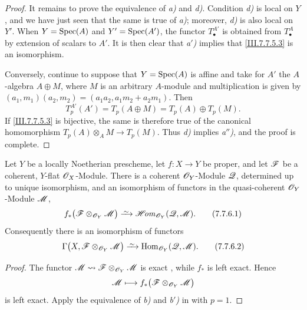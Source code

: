 {\begin{proof}
It remains to prove the equivalence of \emph{a)} and \emph{d)}.  Condition
\emph{d)} is local on $Y$, and we have just seen that the same is
true of \emph{a)}; moreover, \emph{d)} is also local on $Y'$.  When
$Y=\operatorname{Spec}(A)$ and $Y'=\operatorname{Spec}(A')$, the functor
$T^{A'}_\bullet$ is obtained from $T^A_\bullet$ by extension
of scalars to $A'$.  It is then clear that \emph{a$'$)} implies
that \eqref{III.7.7.5.3} is an isomorphism.

Conversely, continue to suppose that $Y=\operatorname{Spec}(A)$ is affine
and take for $A'$ the $A$-algebra $A\oplus M$, where $M$ is
an arbitrary $A$-module and multiplication is given by $(a_1,m_1)(a_2,m_2)=(a_1a_2,a_1m_2+a_2m_1)$.
Then
\[
  T^{A'}_p(A')
  =
  T_p(A\oplus M)
  =
  T_p(A)\oplus T_p(M).
\]
If \eqref{III.7.7.5.3} is bijective, the same is therefore
true of the canonical homomorphism $T_p(A)\otimes_A M\longrightarrow T_p(M)$.
Thus \emph{d)} implies \emph{a$''$)}, and the proof is complete.
\end{proof}

\begin{theorem}[7.7.6]
\label{III.7.7.6}
Let $Y$ be a locally Noetherian prescheme, let
$f:X\to Y$ be proper, and let $\mathscr{F}$ be a coherent,
$Y$-flat $\mathscr{O}_X$-Module.  There is a coherent
$\mathscr{O}_Y$-Module $\mathscr{Q}$, determined up to unique
isomorphism, and an isomorphism of functors in the
quasi-coherent $\mathscr{O}_Y$-Module $\mathscr{M}$,
\[
  f_*
  \bigl(\sh{F}\otimes_{\sh{O}_Y}\sh{M}\bigr)
  \simto
  \shHom_{\sh{O}_Y}(\sh{Q},\sh{M}).
  \tag{7.7.6.1}\label{III.7.7.6.1}
\]
Consequently there is an isomorphism of functors
\[
  \Gamma
  \bigl(X,\sh{F}\otimes_{\sh{O}_Y}\sh{M}\bigr)
  \simto
  \Hom_{\sh{O}_Y}(\sh{Q},\sh{M}).
  \tag{7.7.6.2}\label{III.7.7.6.2}
\]
\end{theorem}

\begin{proof}
The functor
$\mathscr{M}\leadsto
 \mathscr{F}\otimes_{\mathscr{O}_Y}\mathscr{M}$
is exact , while $f_*$ is left exact.
Hence
\[
  \mathscr{M}\longmapsto
  f_*
  \bigl(\mathscr{F}\otimes_{\mathscr{O}_Y}\mathscr{M}\bigr)
\]
is left exact.  Apply the equivalence of \emph{b)} and \emph{b$'$)} in
 with $p=1$.
\end{proof}
}

